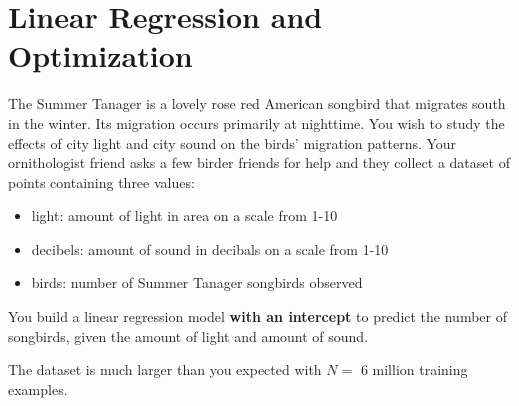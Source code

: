 \section{Linear Regression and Optimization }

\begin{questions}

\question The Summer Tanager is a lovely rose red American songbird that migrates south in the winter. Its migration occurs primarily at nighttime. You wish to study the effects of city light and city sound on the birds' migration patterns. Your ornithologist friend asks a few birder friends for help and they collect a dataset of points containing three values:
\begin{itemize}
    \item light: amount of light in area on a scale from 1-10
    \item decibels: amount of sound in decibals on a scale from 1-10
    \item birds: number of Summer Tanager songbirds observed
\end{itemize}
You build a linear regression model 
\textbf{with an intercept} to predict the number of songbirds, given the amount of light and amount of sound. 

The dataset is much larger than you expected with $N = $ 6 million training examples.

\end{questions}
